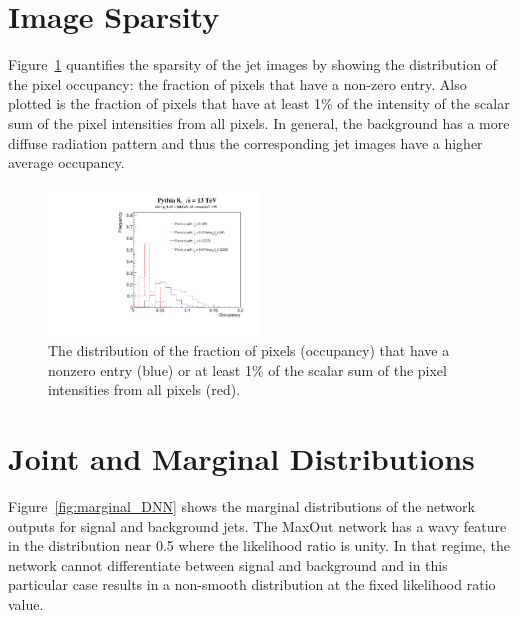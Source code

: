 \documentclass{article}
\begin{document}






\appendix

\clearpage
\newpage

\section{Image Sparsity}
\label{sec:sparsity}

Figure~\ref{fig:occupancy} quantifies the sparsity of the jet images by showing the distribution of the pixel occupancy: the fraction of pixels that have a non-zero entry.  Also plotted is the fraction of pixels that have at least 1\% of the intensity of the scalar sum of the pixel intensities from all pixels.  In general, the background has a more diffuse radiation pattern and thus the corresponding jet images have a higher average occupancy.

\begin{figure}[htbp!]
  \begin{center}
        \includegraphics[width=0.5\textwidth]{figures/occ.pdf}
      \caption{ The distribution of the fraction of pixels (occupancy) that have a nonzero entry (blue) or at least 1\% of the scalar sum of the pixel intensities from all pixels (red).
      \label{fig:occupancy} }
    \end{center}
\end{figure}

\clearpage
\newpage

\section{Joint and Marginal Distributions}
\label{sec:app:dists}

Figure~\ref{fig:marginal_DNN} shows the marginal distributions of the network outputs for signal and background jets.  The MaxOut network has a wavy feature in the distribution near 0.5 where the likelihood ratio is unity.  In that regime, the network cannot differentiate between signal and background and in this particular case results in a non-smooth distribution at the fixed likelihood ratio value.
\end{document}
